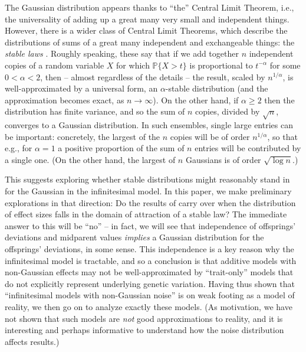 \documentclass{article}
\renewcommand{\P}{\mathbb{P}}
\newcommand{\1}{\mathbbm{1}}
\theoremstyle{remark}
\theoremstyle{definition}
\begin{document}
The Gaussian distribution appears thanks to ``the'' Central Limit Theorem,
i.e., the universality of adding up a great many very small and independent things.
However, there is a wider class of Central Limit Theorems,
which describe the distributions of sums of a great many independent and exchangeable things:
the \emph{stable laws} \citep{gnedenko1968limit}.
Roughly speaking, these say that if we add together $n$ independent copies of a random variable $X$
for which $\P\{ X > t \}$ is proportional to $t^{-\alpha}$ for some $0 < \alpha < 2$,
then -- almost regardless of the details -- the result, scaled by $n^{1/\alpha}$,
is well-approximated by a universal form, an $\alpha$-stable distribution
(and the approximation becomes exact, as $n \to \infty$).
On the other hand, if $\alpha \ge 2$ then the distribution has finite variance,  
and so the sum of $n$ copies, divided by $\sqrt{n}$, converges to a Gaussian distribution.
In such ensembles, single large entries can be important:
concretely, the largest of the $n$ copies will be of order $n^{1/\alpha}$,
so that e.g., for $\alpha=1$ a positive proportion of the sum of $n$ entries will be contributed by a single one.
(On the other hand, the largest of $n$ Gaussians is of order $\sqrt{\log n}$.) 

This suggests exploring whether stable distributions might reasonably stand in for the Gaussian
in the infinitesimal model. 
In this paper, we make preliminary explorations in that direction:
Do the results of \citet{barton2017infinitesimal}
carry over when the distribution of effect sizes falls in the domain of attraction of a stable law?
The immediate answer to this will be ``no'' --
in fact, we will see that independence of offsprings' deviations and midparent values 
\emph{implies} a Gaussian distribution for the offsprings' deviations, in some sense.
This independence is a key reason why the infinitesimal model is tractable,
and so a conclusion is that additive models with non-Gaussian effects may not be well-approximated
by ``trait-only'' models that do not explicitly represent underlying genetic variation.
Having thus shown that ``infinitesimal models with non-Gaussian noise'' is on weak footing as a model of reality,
we then go on to analyze exactly these models.
(As motivation,
we have not shown that such models are \emph{not} good approximations to reality,
and it is interesting and perhaps informative to understand how the noise distribution affects results.)
\end{document}
